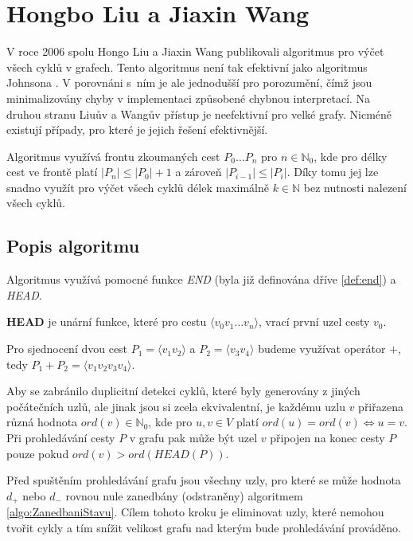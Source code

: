 \chapter{Hongbo Liu a Jiaxin Wang}
    \label{chapter:Algo3}
    V roce 2006 spolu Hongo Liu a Jiaxin Wang publikovali algoritmus \cite{A_new_way_to_enumerate_cycles_in_graph} pro výčet všech cyklů v grafech. Tento algoritmus není tak efektivní jako algoritmus Johnsona \cite{Johnson_1975}. V porovnáni s~ním je ale jednodušší pro porozumění, čímž jsou minimalizovány chyby v implementaci způsobené chybnou interpretací. Na druhou stranu Liuův a Wangův přístup je neefektivní pro velké grafy. Nicméně existují případy, pro které je jejich řešení efektivnější.

    Algoritmus využívá frontu zkoumaných cest $P_0 \dots P_n$ pro $n \in \mathbb{N}_0$, kde pro délky cest ve frontě platí $|P_n| \leq |P_0| + 1$ a zároveň $|P_{i-1}| \leq |P_{i}|$. Díky tomu jej lze snadno využít pro výčet všech cyklů délek maximálně $k \in \mathbb{N}$ bez nutnosti nalezení všech cyklů.

    \section{Popis algoritmu}
        Algoritmus využívá pomocné funkce \textit{END} (byla již definována dříve \ref{def:end}) a \textit{HEAD}.

        \begin{definition}
            \textbf{HEAD} je unární funkce, které pro cestu $\langle v_0 v_1 \dots v_n \rangle$, vrací první uzel cesty $v_0$.
        \end{definition}

        \vspace*{1em}
        Pro sjednocení dvou cest $P_1 = \langle v_1v_2 \rangle$ a $P_2 = \langle v_3v_4 \rangle$ budeme využívat operátor $+$, tedy $P_1 + P_2 = \langle v_1v_2v_3v_4 \rangle$.

        Aby se zabránilo duplicitní detekci cyklů, které byly generovány z jiných počátečních uzlů, ale jinak jsou si zcela ekvivalentní, je každému uzlu $v$ přiřazena různá hodnota $ord(v) \in \mathbb{N}_0$, kde pro $u, v \in V$ platí $ord(u) = ord(v) \iff u = v$. Při prohledávání cesty $P$ v grafu pak může být uzel $v$ připojen na konec cesty $P$ pouze pokud $ord(v) > ord(\textit{HEAD}(P))$.

        Před spuštěním prohledávání grafu jsou všechny uzly, pro které se může hodnota $d_+$ nebo $d_-$ rovnou nule zanedbány (odstraněny) algoritmem \ref{algo:ZanedbaniStavu}. Cílem tohoto kroku je eliminovat uzly, které nemohou tvořit cykly a tím snížit velikost grafu nad kterým bude prohledávání prováděno.


